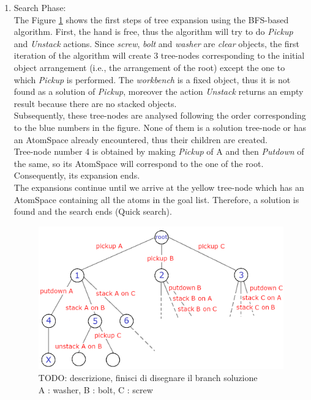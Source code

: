 \begin{enumerate}
	\item Search Phase: \\
The Figure \ref{fig:BFS_1} shows the first steps of tree expansion using the BFS-based algorithm.
First, the hand is free, thus the algorithm will try to do \textit{Pickup} and \textit{Unstack} actions. Since \textit{screw}, \textit{bolt} and \textit{washer} are \textit{clear} objects, the first iteration of the algorithm will create 3 tree-nodes corresponding to the initial object arrangement (i.e., the arrangement of the root) except the one to which \textit{Pickup} is performed. The \textit{workbench} is a fixed object, thus it is not found as a solution of \textit{Pickup}, moreover the action \textit{Unstack} returns an empty result because there are no stacked objects\footnotemark{}. \\
Subsequently, these tree-nodes are analysed following the order corresponding to the blue numbers in the figure. None of them is a solution tree-node or has an AtomSpace already encountered, thus their children are created. \\
Tree-node number 4 is obtained by making \textit{Pickup} of A and then \textit{Putdown} of the same, so its AtomSpace will correspond to the one of the root. Consequently, its expansion ends. \\
The expansions continue until we arrive at the yellow tree-node which has an AtomSpace containing all the atoms in the goal list. Therefore, a solution is found and the search ends (Quick search).

\begin{figure} [h]
\centering
\includegraphics[width=1.0
\textwidth]{figures/Magistrale/BFS_1_blue}
\caption[BFS Example]{ TODO: descrizione, finisci di disegnare il branch soluzione\\ A : washer, B : bolt, C : screw
\label{fig:BFS_1}}
\end{figure} 


\end{enumerate}
